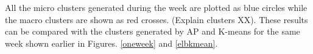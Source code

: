 All the micro clusters generated during the week are plotted as blue circles while the macro clusters are shown as red crosses. (Explain clusters XX). These results can be compared with the clusters generated by AP and K-means for the same week shown earlier in Figures. \ref{oneweek} and \ref{elbkmean}. 






